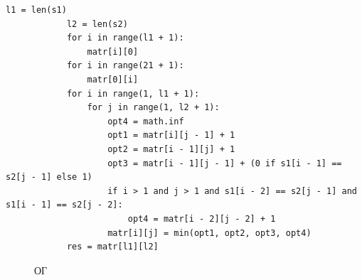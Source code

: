 \documentclass[a4paper, 14pt]{article}
\begin{document}
        \begin{lstlisting}[label=some-code,caption=Функция нахождения расстояния Дамерау-Левенштейна итеративно]
			l1 = len(s1)
			l2 = len(s2)
			for i in range(l1 + 1):
				matr[i][0]
			for i in range(21 + 1):
				matr[0][i]				
			for i in range(1, l1 + 1):
				for j in range(1, l2 + 1):
				    opt4 = math.inf
				    opt1 = matr[i][j - 1] + 1
				    opt2 = matr[i - 1][j] + 1
				    opt3 = matr[i - 1][j - 1] + (0 if s1[i - 1] == s2[j - 1] else 1)
				    if i > 1 and j > 1 and s1[i - 2] == s2[j - 1] and s1[i - 1] == s2[j - 2]:
				        opt4 = matr[i - 2][j - 2] + 1 
				    matr[i][j] = min(opt1, opt2, opt3, opt4) 
			res = matr[l1][l2]
        \end{lstlisting}
      \begin{figure}[h]
			\caption{ОГ}
			\label{ris:image}
		\end{figure}
\end{document}
